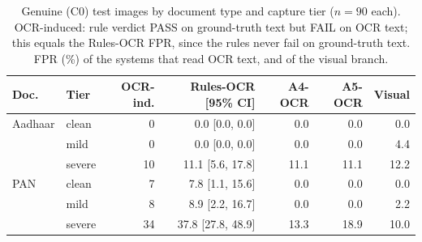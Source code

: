 \begin{table}[!t]
\caption{Genuine (C0) test images by document type and capture tier ($n=90$ each). OCR-induced: rule verdict PASS on ground-truth text but FAIL on OCR text; this equals the Rules-OCR FPR, since the rules never fail on ground-truth text. FPR (\%) of the systems that read OCR text, and of the visual branch.}
\label{tab:rq46}
\centering
\scriptsize
\setlength{\tabcolsep}{3pt}
\renewcommand{\arraystretch}{1.06}
\begin{tabular}{@{}l l r r r r r@{}}
\toprule
Doc. & Tier & OCR-ind. & Rules-OCR [95\% CI] & A4-OCR & A5-OCR & Visual \\
\midrule
Aadhaar & clean & 0 & 0.0 {\tiny[0.0, 0.0]} & 0.0 & 0.0 & 0.0 \\
 & mild & 0 & 0.0 {\tiny[0.0, 0.0]} & 0.0 & 0.0 & 4.4 \\
 & severe & 10 & 11.1 {\tiny[5.6, 17.8]} & 11.1 & 11.1 & 12.2 \\
\addlinespace[1.5pt]
PAN & clean & 7 & 7.8 {\tiny[1.1, 15.6]} & 0.0 & 0.0 & 0.0 \\
 & mild & 8 & 8.9 {\tiny[2.2, 16.7]} & 0.0 & 0.0 & 2.2 \\
 & severe & 34 & 37.8 {\tiny[27.8, 48.9]} & 13.3 & 18.9 & 10.0 \\
\bottomrule
\end{tabular}
\end{table}
